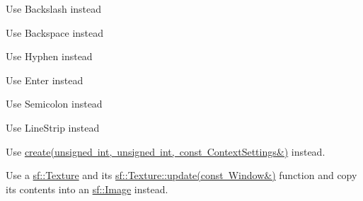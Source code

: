 \begin{DoxyRefList}
\item[Member \mbox{\hyperlink{classsf_1_1Keyboard_acb4cacd7cc5802dec45724cf3314a142a536df84e73859aa44e11e192459470b6}{sf\+::Keyboard\+::Back\+Slash}} ]\label{deprecated__deprecated000026}%
%
Use Backslash instead  
\item[Member \mbox{\hyperlink{classsf_1_1Keyboard_acb4cacd7cc5802dec45724cf3314a142a33aeaab900abcd01eebf2fcc4f6d97e2}{sf\+::Keyboard\+::Back\+Space}} ]\label{deprecated__deprecated000025}%
%
Use Backspace instead  
\item[Member \mbox{\hyperlink{classsf_1_1Keyboard_acb4cacd7cc5802dec45724cf3314a142a401a183dcfde0a06cb60fe6c91fa1e39}{sf\+::Keyboard\+::Dash}} ]\label{deprecated__deprecated000024}%
%
Use Hyphen instead  
\item[Member \mbox{\hyperlink{classsf_1_1Keyboard_acb4cacd7cc5802dec45724cf3314a142ac291de81bdee518d636bc359f2ca77de}{sf\+::Keyboard\+::Return}} ]\label{deprecated__deprecated000028}%
%
Use Enter instead  
\item[Member \mbox{\hyperlink{classsf_1_1Keyboard_acb4cacd7cc5802dec45724cf3314a142a460ab09a36f9ed230504b89b9815de88}{sf\+::Keyboard\+::Semi\+Colon}} ]\label{deprecated__deprecated000027}%
%
Use Semicolon instead  
\item[Member \mbox{\hyperlink{group__graphics_gga5ee56ac1339984909610713096283b1ba5b09910f5d0f39641342184ccd0d1de3}{sf\+::Lines\+Strip}} ]\label{deprecated__deprecated000006}%
%
Use Line\+Strip instead  
\item[Member \mbox{\hyperlink{classsf_1_1RenderTexture_a0e945c4ce7703591c7f240b169744603}{sf\+::Render\+Texture\+::create}} (unsigned int width, unsigned int height, bool depth\+Buffer)]\label{deprecated__deprecated000009}%
%
Use \mbox{\hyperlink{classsf_1_1RenderTexture_a49b7b723a80f89bc409a942364351dc3}{create(unsigned int, unsigned int, const Context\+Settings\&)}} instead. 
\item[Member \mbox{\hyperlink{classsf_1_1RenderWindow_a5a784b8a09bf4a8bc97ef9e0a8957c35}{sf\+::Render\+Window\+::capture}} () const]\label{deprecated__deprecated000010}%
%
 Use a \mbox{\hyperlink{classsf_1_1Texture}{sf\+::\+Texture}} and its \mbox{\hyperlink{classsf_1_1Texture_ad3cceef238f7d5d2108a98dd38c17fc5}{sf\+::\+Texture\+::update(const Window\&)}} function and copy its contents into an \mbox{\hyperlink{classsf_1_1Image}{sf\+::\+Image}} instead.  

\end{DoxyRefList}

